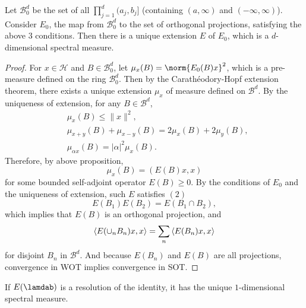 \documentclass[a4paper,12pt]{article}
\begin{document}
\begin{thm}
    Let $\mathcal{B}^d_0$ be the set of all $\prod_{j=1}^d(a_j,b_j]$ (containing $(a,\infty)$ and $(-\infty, \infty)$). Consider $E_0$, the map from $\mathcal{B}^d_0$ to the set of orthogonal projections, satisfying the above $3$ conditions. Then there is a unique extension $E$ of $E_0$, which is a $d$-dimensional spectral measure. 
\end{thm}
\begin{proof}
    For $x \in \mathcal{H}$ and $B \in \mathcal{B}^d_0$, let $\mu_x(B) = \norm{E_0(B)x}^2$, which is a pre-measure defined on the ring $\mathcal{B}^d_0$. Then by the Carathéodory-Hopf extension theorem, there exists a unique extension $\mu_x$ of measure defined on $\mathcal{B}^d$. By the uniqueness of extension, for any $B \in \mathcal{B}^d$,
    \begin{equation*}
        \begin{aligned}
            & \mu_x(B) \leq\|x\|^2, \\
            & \mu_{x+y}(B)+\mu_{x-y}(B)=2 \mu_x(B)+2 \mu_y(B), \\
            & \mu_{\alpha x}(B)=|\alpha|^2 \mu_x(B).
        \end{aligned}
    \end{equation*}
    Therefore, by above proposition,
    \begin{equation*}
        \mu_x(B)=(E(B) x, x)
    \end{equation*}
    for some bounded self-adjoint operator $E(B) \geq 0$. By the conditions of $E_0$ and the uniqueness of extension, such $E$ satisfies $(2)$ 
    \begin{equation*}
        E\left(B_1\right) E\left(B_2\right)=E\left(B_1 \cap B_2\right),
    \end{equation*}
    which implies that $E(B)$ is an orthogonal projection, and
    \begin{equation*}
        \left\langle E(\cup_n B_n)x,x \right\rangle = \sum_n \left\langle E(B_n)x,x \right\rangle
    \end{equation*}
    for disjoint $B_n$ in $\mathcal{B}^d$. And because $E(B_n)$ and $E(B)$ are all projections, convergence in WOT implies convergence in SOT.
\end{proof}
\begin{cor}
    If $E(\lamdab)$ is a resolution of the identity, it has the unique $1$-dimensional spectral measure.
\end{cor}
\end{document}
